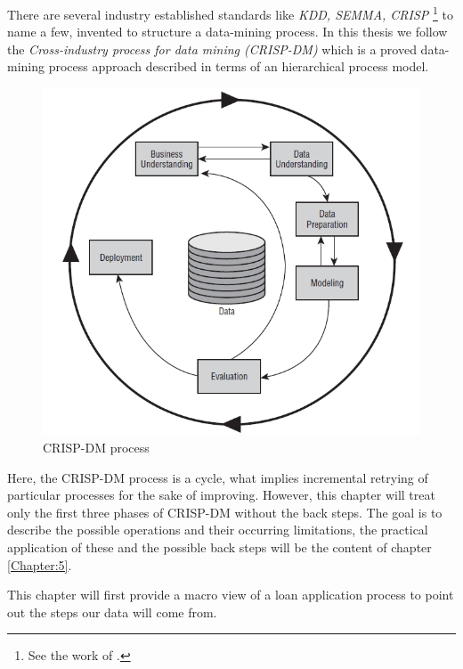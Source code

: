 There are several industry established standards like \textit{KDD, SEMMA, CRISP} \footnote{See the work of \cite{Azevedo;Santos;Filipe:2008}.} to name a few, invented to structure a data-mining process. In this thesis we follow the \textit{Cross-industry process for data mining (CRISP-DM)} \cite{crisp} which is a proved data-mining process approach described in terms of an hierarchical process model.
\begin{figure}[h!]
    \centering
    \includegraphics[scale=0.5]{Graphics/crisp-dm.png}
    \caption{CRISP-DM process}
    \label{fig:crisp-dm}
\end{figure}

Here, the CRISP-DM process is a cycle, what implies incremental retrying of particular processes for the sake of improving. However, this chapter will treat only the first three phases of CRISP-DM without the back steps. The goal is to describe the possible operations and their occurring limitations, the practical application of these and the possible back steps will be the content of chapter \ref{Chapter:5}.

This chapter will first provide a macro view of a loan application process to point out the steps our data will come from.

